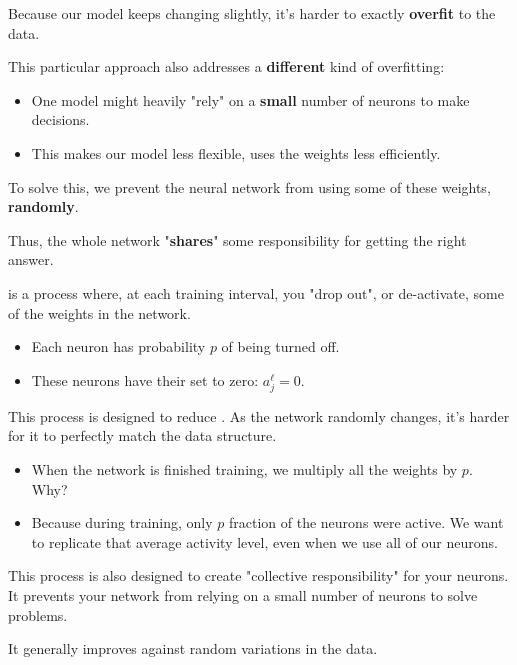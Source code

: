         Because our model keeps changing slightly, it's harder to exactly \textbf{overfit} to the data.

        \subsecdiv

        This particular approach also addresses a \textbf{different} kind of overfitting:

        \begin{itemize}
            \item One model might heavily "rely" on a \textbf{small} number of neurons to make decisions.
            \item This makes our model less flexible, uses the weights less efficiently.
        \end{itemize}
        
        To solve this, we prevent the neural network from using some of these weights, \textbf{randomly}.

        Thus, the whole network "\textbf{shares}" some responsibility for  getting the right answer.\\

        \begin{definition}
             is a process where, at each training interval, you  "drop out", or de-activate, some of the weights in the network.

            \begin{itemize}
                \item Each neuron has probability $p$ of being turned off.
                \item These neurons have their  set to zero: $a^\ell_j=0$.
            \end{itemize}

            This process is designed to reduce . As the network randomly changes, it's harder for it to perfectly match the data structure.

            \subsecdiv

            \begin{itemize}
                \item When the network is finished training, we multiply all the weights by $p$. Why?
            
                \item Because during training, only $p$ fraction of the neurons were active. We want to replicate that average activity level, even when we use all of our neurons.
            \end{itemize}

            

            \subsecdiv

            This process is also designed to create "collective responsibility" for your neurons. It prevents your network from relying on a small number of neurons to solve problems.

            It generally improves  against random variations in the data.
        \end{definition}

